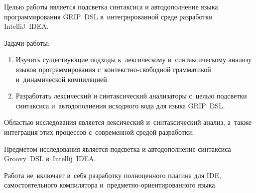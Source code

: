 Целью работы является подсветка синтаксиса и автодополнение языка программирования GRIP~DSL в~интегрированной среде разработки IntelliJ~IDEA.

Задачи работы: 
\begin{enumerate} 
	\item{Изучить существующие подходы к~лексическому и~синтаксическому анализу языков программирования с~контекстно-свободной грамматикой и~динамической компиляцией.}	
	\item{Разработать лексический и синтаксический анализаторы с~целью подсветки синтаксиса и~автодополнения исходного кода для языка GRIP~DSL.}
\end{enumerate} 

Областью исследования является лексический и~синтаксический анализ, а~также интеграция этих процессов с~современной средой разработки.

Предметом исследования является подсветка и автодополнение синтаксиса Groovy~DSL в~Intellij~IDEA. 

Работа не~включает в~себя разработку полноценного плагина для IDE, самостоятельного компилятора и~предметно-ориентированного языка.


%
